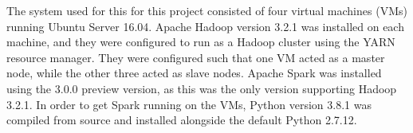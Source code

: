 The system used for this for this project consisted of four virtual machines (VMs) running Ubuntu Server 16.04. Apache Hadoop version 3.2.1 was installed on each machine, and they were configured to run as a Hadoop cluster using the YARN resource manager. They were configured such that one VM acted as a master node, while the other three acted as slave nodes.
Apache Spark was installed using the 3.0.0 preview version, as this was the only version supporting Hadoop 3.2.1. In order to get Spark running on the VMs, Python version 3.8.1 was compiled from source and installed alongside the default Python 2.7.12.